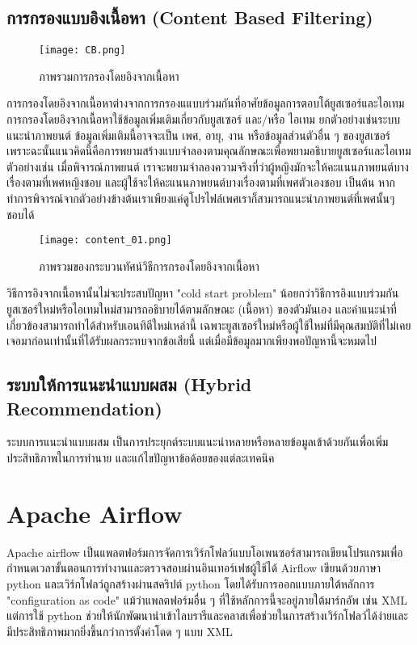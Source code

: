 \subsection{การกรองแบบอิงเนื้อหา (Content Based Filtering)}
\begin{figure}[!h]
  \centering
  \texttt{[image: CB.png]}  
  \caption{ภาพรวมการกรองโดยอิงจากเนื้อหา}
  \label{Fig:CB}
\end{figure}
การกรองโดยอิงจากเนื้อหาต่างจากการกรองแแบบร่วมกันที่อาศัยข้อมูลการตอบโต้ยูสเซอร์และไอเทม การกรองโดยอิงจากเนื้อหาใช้ข้อมูลเพิ่มเติมเกี่ยวกับยูสเซอร์ และ/หรือ ไอเทม ยกตัวอย่างเช่นระบบแนะนำภาพยนต์ 
ข้อมูลเพิ่มเติมนี้อาจจะเป็น เพศ, อายุ, งาน หรือข้อมูลส่วนตัวอื่น ๆ ของยูสเซอร์ เพราะฉะนั้นแนวคิดนี้คือการพยามสร้างแบบจำลองตามคุณลักษณะเพื่อพยามอธิบายยูสเซอร์และไอเทม ตัวอย่างเช่น เมื่อพิจารณ์ภาพยนต์ เราจะพยามจำลองความจริงที่ว่าผู้หญิงมักจะให้คะแนนภาพยนต์บางเรื่องตามที่เพศหญิงชอบ และผู้ใช้จะให้คะแนนภาพยนต์บางเรื่องตามที่เพศตัวเองชอบ เป็นต้น หากทำการพิจารณ์จากตัวอย่างข้างต้นเราเพียงแค่ดูโปรไฟล์เพศเราก็สามารถแนะนำภาพยนต์ที่เพศนั้นๆ ชอบได้
\newline
\begin{figure}[!h]
  \centering
  \texttt{[image: content\_01.png]}  
  \caption{ภาพรวมของกระบวนทัศน์วิธีการกรองโดยอิงจากเนื้อหา}
  \label{Fig:content_01}
\end{figure}
วิธีการอิงจากเนื้อหานั้นไม่จะประสบปัญหา "cold start problem" น้อยกว่าวิธีการอิงแบบร่วมกัน ยูสเซอร์ใหม่หรือไอเทมใหม่สามารถอธิบายได้ตามลักษณะ (เนื้อหา) ของตัวมันเอง และคำแนะนำที่เกี่ยวข้องสามารถทำได้สำหรับเอนทิตีใหม่เหล่านี้ เฉพาะยูสเซอร์ใหม่หรือผู้ใช้ใหม่ที่มีคุณสมบัติที่ไม่เคยเจอมาก่อนเท่านั้นที่ได้รับผลกระทบจากข้อเสียนี้ แต่เมื่อมีข้อมูลมากเพียงพอปัญหานี้จะหมดไป
\pagebreak

\subsection{ระบบให้การแนะนำแบบผสม (Hybrid Recommendation)}
ระบบการแนะนำแบบผสม เป็นการประยุกต์ระบบแนะนำหลายหรือหลายข้อมูลเข้าด้วยกันเพื่อเพิ่มประสิทธิภาพในการทำนาย และแก้ไขปัญหาข้อด้อยของแต่ละเทคนิค


\section{Apache Airflow}
Apache airflow \cite{airflow} เป็นแพลตฟอร์มการจัดการเวิร์กโฟลว์แบบโอเพนซอร์สามารถเขียนโปรแกรมเพื่อกำหนดเวลาขั้นตอนการทำงานและตรวจสอบผ่านอินเทอร์เฟชผู้ใช้ได้
Airflow เขียนด้วยภาษา python และเวิร์กโฟลว์ถูกสร้างผ่านสคริปต์ python โดยได้รับการออกแบบภายใต้หลักการ "configuration as code" แม้ว่าแพลตฟอร์มอื่น ๆ ที่ใช้หลักการนี้จะอยู่ภายใต้มาร์กอัพ เช่น XML แต่การใช้ python ช่วยให้นักพัฒนานำเข้าไลบรารีและคลาสเพื่อช่วยในการสร้างเวิร์กโฟลว์ได้ง่ายและมีประสิทธิภาพมากยิ่งขึ้นกว่าการตั้งค่าโดด ๆ แบบ XML

